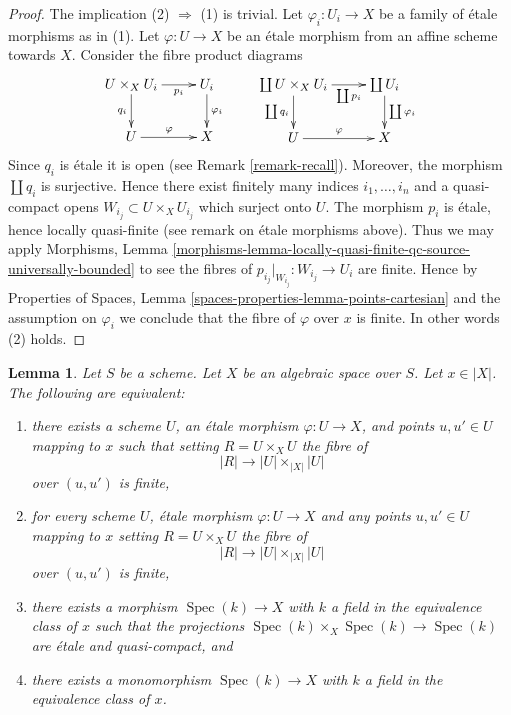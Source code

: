\documentclass{stacks-project}
\theoremstyle{plain}
\newtheorem{lemma}[subsection]{Lemma}
\theoremstyle{definition}
\theoremstyle{remark}
\numberwithin{equation}{subsection}
\def\Spec{\mathop{\mathrm{Spec}}}
\begin{document}
\begin{proof}
The implication (2) $\Rightarrow$ (1) is trivial.
Let $\varphi_i : U_i \to X$ be a family of \'etale morphisms as in (1).
Let $\varphi : U \to X$ be an \'etale morphism from an affine scheme
towards $X$. Consider the fibre product diagrams
$$
\xymatrix{
U \times_X U_i \ar[r]_-{p_i} \ar[d]_{q_i} & U_i \ar[d]^{\varphi_i} \\
U \ar[r]^\varphi & X
}
\quad \quad
\xymatrix{
\coprod U \times_X U_i \ar[r]_-{\coprod p_i} \ar[d]_{\coprod q_i} &
\coprod U_i \ar[d]^{\coprod \varphi_i} \\
U \ar[r]^\varphi & X
}
$$
Since $q_i$ is \'etale it is open (see Remark \ref{remark-recall}).
Moreover, the morphism $\coprod q_i$ is surjective.
Hence there exist finitely many indices $i_1, \ldots, i_n$ and
a quasi-compact opens $W_{i_j} \subset U \times_X U_{i_j}$
which surject onto $U$.
The morphism $p_i$ is \'etale, hence locally quasi-finite (see remark on
\'etale morphisms above). Thus we may apply
Morphisms, Lemma
\ref{morphisms-lemma-locally-quasi-finite-qc-source-universally-bounded}
to see the fibres of $p_{i_j}|_{W_{i_j}} : W_{i_j} \to U_i$ are finite.
Hence by
Properties of Spaces,
Lemma \ref{spaces-properties-lemma-points-cartesian}
and the assumption on $\varphi_i$ we conclude that the fibre
of $\varphi$ over $x$ is finite. In other words (2) holds.
\end{proof}

\begin{lemma}
\label{lemma-R-finite-above-x}
Let $S$ be a scheme. Let $X$ be an algebraic space over $S$.
Let $x \in |X|$. The following are equivalent:
\begin{enumerate}
\item there exists a scheme $U$, an \'etale morphism
$\varphi : U \to X$, and points $u, u' \in U$ mapping to
$x$ such that setting $R = U \times_X U$ the fibre of
$$
|R| \to |U| \times_{|X|} |U|
$$
over $(u, u')$ is finite,
\item for every scheme $U$, \'etale morphism $\varphi : U \to X$ and
any points $u, u' \in U$ mapping to
$x$ setting $R = U \times_X U$ the fibre of
$$
|R| \to |U| \times_{|X|} |U|
$$
over $(u, u')$ is finite,
\item there exists a morphism $\Spec(k) \to X$ with $k$ a field
in the equivalence class of $x$ such that the projections
$\Spec(k) \times_X \Spec(k) \to \Spec(k)$ are
\'etale and quasi-compact, and
\item there exists a monomorphism $\Spec(k) \to X$ with $k$ a field
in the equivalence class of $x$.
\end{enumerate}
\end{lemma}
\end{document}
